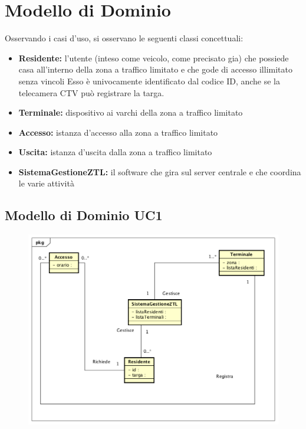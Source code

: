 \documentclass[12pt, letterpaper]{article}
\begin{document}
\section{Modello di Dominio}
Osservando i casi d'uso, si osservano le seguenti
classi concettuali:
\begin{itemize}
    \item \textbf{Residente:} l'utente (inteso
    come veicolo, come precisato gia) che possiede
    casa all'interno della zona a traffico limitato
    e che gode di accesso illimitato senza vincoli
    Esso è univocamente identificato dal codice ID,
    anche se la telecamera CTV può registrare la 
    targa.
    \item \textbf{Terminale:} dispositivo ai varchi 
    della zona a traffico limitato
    \item \textbf{Accesso:} istanza d'accesso alla 
    zona a traffico limitato
    \item \textbf{Uscita:} istanza d'uscita dalla 
    zona a traffico limitato
    \item \textbf{SistemaGestioneZTL:} il software
    che gira sul server centrale e che coordina
    le varie attività
\end{itemize}

\subsection{Modello di Dominio UC1}
\begin{figure}[H]
    \centering
    \includegraphics[scale=0.50]{I1-UC1-DM}
    \label{fig:mesh1}
\end{figure}
\end{document}
